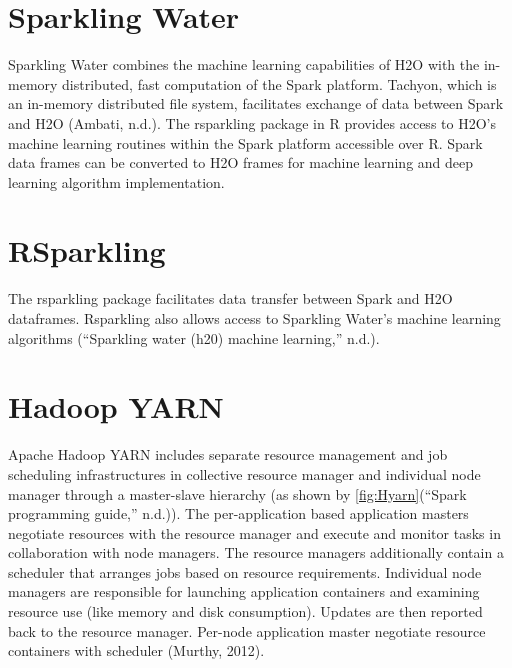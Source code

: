 \documentclass[12pt,twoside]{amherstthesis}
\begin{document}
  \section{Sparkling Water}\label{sparkling-water}
  
  Sparkling Water combines the machine learning capabilities of H2O with
  the in-memory distributed, fast computation of the Spark platform.
  Tachyon, which is an in-memory distributed file system, facilitates
  exchange of data between Spark and H2O (Ambati, n.d.). The rsparkling
  package in R provides access to H2O's machine learning routines within
  the Spark platform accessible over R. Spark data frames can be converted
  to H2O frames for machine learning and deep learning algorithm
  implementation.
  
  \section{RSparkling}\label{rsparkling}
  
  The rsparkling package facilitates data transfer between Spark and H2O
  dataframes. Rsparkling also allows access to Sparkling Water's machine
  learning algorithms (``Sparkling water (h20) machine learning,'' n.d.).
  
  \section{Hadoop YARN}\label{hadoop-yarn}
  
  Apache Hadoop YARN includes separate resource management and job
  scheduling infrastructures in collective resource manager and individual
  node manager through a master-slave hierarchy (as shown by
  \autoref{fig:Hyarn}(``Spark programming guide,'' n.d.)). The
  per-application based application masters negotiate resources with the
  resource manager and execute and monitor tasks in collaboration with
  node managers. The resource managers additionally contain a scheduler
  that arranges jobs based on resource requirements. Individual node
  managers are responsible for launching application containers and
  examining resource use (like memory and disk consumption). Updates are
  then reported back to the resource manager. Per-node application master
  negotiate resource containers with scheduler (Murthy, 2012).
  
\end{document}
